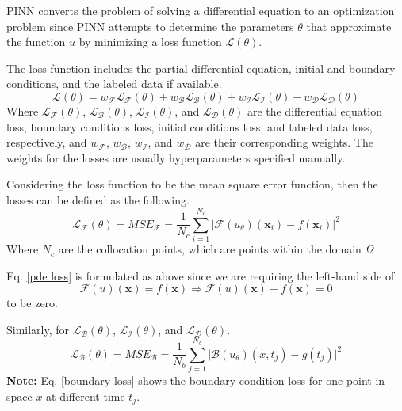 \documentclass[a4paper, onecolumn, 12pt]{article}
\begin{document}
PINN converts the problem of solving a differential equation 
to an optimization problem since PINN attempts to determine the parameters $\theta$ 
that approximate the function $u$ by minimizing a loss function $\mathcal{L}(\theta)$\cite{cuomo2022scientific}.

The loss function includes the partial differential equation, initial and boundary conditions, and 
the labeled data if available.
\begin{equation}
\mathcal{L}(\theta) = w_{\mathcal{F}} \mathcal{L}_{\mathcal{F}}(\theta)
+ w_{\mathcal{B}} \mathcal{L}_{\mathcal{B}}(\theta) 
+ w_{\mathcal{I}} \mathcal{L}_{\mathcal{I}}(\theta)
+ w_{\mathcal{D}} \mathcal{L}_{\mathcal{D}}(\theta)
\end{equation}
Where $\mathcal{L}_{\mathcal{F}}(\theta)$, $\mathcal{L}_{\mathcal{B}}(\theta)$, 
$\mathcal{L}_{\mathcal{I}}(\theta)$, and $\mathcal{L}_{\mathcal{D}}(\theta)$ are the differential equation loss,
boundary conditions loss, initial conditions loss, and labeled data loss, respectively, and $w_{\mathcal{F}}$, 
$w_{\mathcal{B}}$, $w_{\mathcal{I}}$, and $w_{\mathcal{D}}$ are their corresponding weights. 
The weights for the losses are usually hyperparameters specified manually.

Considering the loss function to be the mean square error function, then the losses can be 
defined as the following.
\begin{equation}\label{pde loss}
\mathcal{L}_{\mathcal{F}}(\theta) = MSE_{\mathcal{F}} 
= \frac{1}{N_c} \sum_{i=1}^{N_c} \bigg| \mathcal{F}(u_\theta)(\mathbf{x}_i) - f(\mathbf{x}_i) \bigg|^2
\end{equation}
Where $N_c$ are the collocation points, which are points within the domain $\Omega$

Eq. \ref{pde loss} is formulated as above since we are requiring the left-hand side of 
$$
\mathcal{F}(u)(\mathbf{x}) = f(\mathbf{x})  \Rightarrow 
\mathcal{F}(u)(\mathbf{x}) - f(\mathbf{x}) = 0
$$
to be zero.

Similarly, for $\mathcal{L}_{\mathcal{B}}(\theta)$,  $\mathcal{L}_{\mathcal{I}}(\theta)$, and 
$\mathcal{L}_{\mathcal{D}}(\theta)$.
\begin{equation}\label{boundary loss}
\mathcal{L}_{\mathcal{B}}(\theta) = MSE_{\mathcal{B}} 
= \frac{1}{N_b} \sum_{j=1}^{N_b} \bigg| \mathcal{B}(u_\theta)(x, t_j) - g(t_j) \bigg|^2
\end{equation}
\textbf{Note:} Eq. \ref{boundary loss} shows the boundary condition loss for one point in space $x$ 
at different time $t_j$. 
\end{document}
